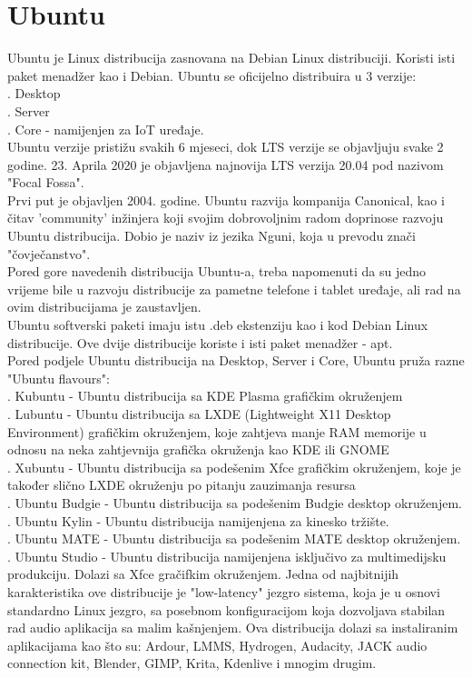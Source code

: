 \documentclass[12pt,vi]{mitthesis}
\begin{document}
\section*{Ubuntu}
Ubuntu je Linux distribucija zasnovana na Debian Linux distribuciji. Koristi isti paket menadžer kao i Debian. Ubuntu se oficijelno distribuira u 3 verzije:\\
. Desktop\\
. Server\\
. Core - namijenjen za IoT uređaje.\\
\indent
Ubuntu verzije pristižu svakih 6 mjeseci, dok LTS verzije se objavljuju svake 2 godine. 23. Aprila 2020 je objavljena najnovija LTS verzija 20.04 pod nazivom "Focal Fossa".\\
\indent
Prvi put je objavljen 2004. godine. Ubuntu razvija kompanija Canonical, kao i čitav 'community' inžinjera koji svojim dobrovoljnim radom doprinose razvoju Ubuntu distribucija. Dobio je naziv iz jezika Nguni, koja u prevodu znači "čovječanstvo".\\
Pored gore navedenih distribucija Ubuntu-a, treba napomenuti da su jedno vrijeme bile u razvoju distribucije za pametne telefone i tablet uređaje, ali rad na ovim distribucijama je zaustavljen.\\
\indent
Ubuntu softverski paketi imaju istu .deb ekstenziju kao i kod Debian Linux distribucije. Ove dvije distribucije koriste i isti paket menadžer - apt.\\
\indent
Pored podjele Ubuntu distribucija na Desktop, Server i Core, Ubuntu pruža razne "Ubuntu flavours":\\
. Kubuntu - Ubuntu distribucija sa KDE Plasma grafičkim okruženjem\\
. Lubuntu - Ubuntu distribucija sa LXDE (Lightweight X11 Desktop Environment) grafičkim okruženjem, koje zahtjeva manje RAM memorije u odnosu na neka zahtjevnija grafička okruženja kao KDE ili GNOME\\
. Xubuntu - Ubuntu distribucija sa podešenim Xfce grafičkim okruženjem, koje je također slično LXDE okruženju po pitanju zauzimanja resursa\\
. Ubuntu Budgie - Ubuntu distribucija sa podešenim Budgie desktop okruženjem.\\
. Ubuntu Kylin - Ubuntu distribucija namijenjena za kinesko tržište.\\
. Ubuntu MATE - Ubuntu distribucija sa podešenim MATE desktop okruženjem.\\
. Ubuntu Studio - Ubuntu distribucija namijenjena isključivo za multimedijsku produkciju. Dolazi sa Xfce gračifkim okruženjem. Jedna od najbitnijih karakteristika ove distribucije je "low-latency" jezgro sistema, koja je u osnovi standardno Linux jezgro, sa posebnom konfiguracijom koja dozvoljava stabilan rad audio aplikacija sa malim kašnjenjem. Ova distribucija dolazi sa instaliranim aplikacijama kao što su: Ardour, LMMS, Hydrogen, Audacity, JACK audio connection kit, Blender, GIMP, Krita, Kdenlive i mnogim drugim.\\
\end{document}
